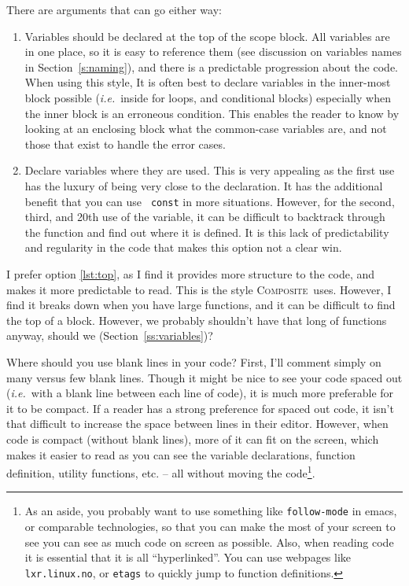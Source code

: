 \documentclass[11pt,onecolumn]{article}
\def\composite{\textsc{Composite}}
\def\ie{\textit{i.e.}}
\newcommand{\head}[1]{\vspace{0.4em}\noindent{\bf #1}}
\begin{document}
There are arguments that can go either way:
\begin{enumerate}[itemsep=0pt,topsep=1pt,parsep=1pt,leftmargin=2.5em]
\item Variables should be declared at the top of the scope block.  All
  variables are in one place, so it is easy to reference them (see
  discussion on variables names in Section~\ref{s:naming}), and there
  is a predictable progression about the code.  When using this style,
  It is often best to declare variables in the inner-most block
  possible (\ie\ inside for loops, and conditional blocks) especially
  when the inner block is an erroneous condition.  This enables the
  reader to know by looking at an enclosing block what the common-case
  variables are, and not those that exist to handle the error
  cases.\label{lst:top}
\item Declare variables where they are used.  This is very appealing
  as the first use has the luxury of being very close to the
  declaration.  It has the additional benefit that you can use {\tt
    const} in more situations.  However, for the second, third, and
  20th use of the variable, it can be difficult to backtrack through
  the function and find out where it is defined.  It is this lack of
  predictability and regularity in the code that makes this option not
  a clear win.
\end{enumerate}

I prefer option \ref{lst:top}, as I find it provides more structure to
the code, and makes it more predictable to read.  This is the style
\composite\ uses.  However, I find it breaks down when you have large
functions, and it can be difficult to find the top of a block.
However, we probably shouldn't have that long of functions anyway,
should we (Section~\ref{ss:variables})?

\head{Use of blank lines.} Where should you use blank lines in your
code?  First, I'll comment simply on many versus few blank lines.
Though it might be nice to see your code spaced out (\ie\ with a blank
line between each line of code), it is much more preferable for it to
be compact.  If a reader has a strong preference for spaced out code,
it isn't that difficult to increase the space between lines in their
editor.  However, when code is compact (without blank lines), more of
it can fit on the screen, which makes it easier to read as you can see
the variable declarations, function definition, utility functions,
etc. -- all without moving the code\footnote{As an aside, you probably
  want to use something like {\tt follow-mode} in emacs, or comparable
  technologies, so that you can make the most of your screen to see
  you can see as much code on screen as possible.  Also, when reading
  code it is essential that it is all ``hyperlinked''.  You can use
  webpages like {\tt lxr.linux.no}, or {\tt etags} to quickly jump to
  function definitions.}.
\end{document}
